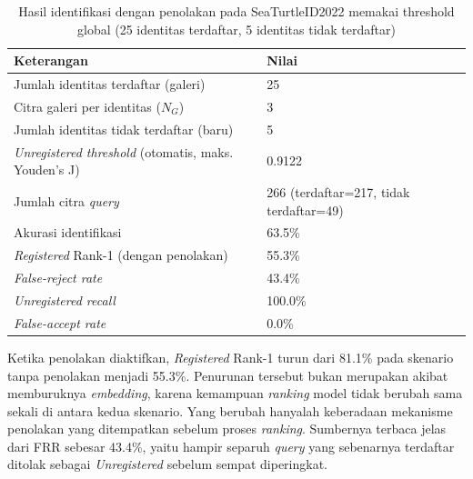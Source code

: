 \begin{table}[htbp]
    \centering
    \caption{Hasil identifikasi dengan penolakan pada SeaTurtleID2022 memakai threshold global (25 identitas terdaftar, 5 identitas tidak terdaftar)}
    \label{tab:crossdataset_seaturtleid2022}
    \renewcommand{\arraystretch}{1.25}
    \begin{tabular}{ll}
        \hline
        \textbf{Keterangan}                                          & \textbf{Nilai}                          \\
        \hline
        Jumlah identitas terdaftar (galeri)                          & 25                                      \\
        Citra galeri per identitas ($N_G$)                           & 3                                       \\
        Jumlah identitas tidak terdaftar (baru)                      & 5                                       \\
        \textit{Unregistered threshold} (otomatis, maks. Youden's J) & 0{.}9122                                \\
        Jumlah citra \textit{query}                                  & 266 (terdaftar=217, tidak terdaftar=49) \\
        Akurasi identifikasi                                         & 63.5\%                                  \\
        \textit{Registered} Rank-1 (dengan penolakan)                & 55.3\%                                  \\
        \textit{False-reject rate}                                   & 43.4\%                                  \\
        \textit{Unregistered recall}                                 & 100.0\%                                 \\
        \textit{False-accept rate}                                   & 0.0\%                                   \\
        \hline
    \end{tabular}
\end{table}

Ketika penolakan diaktifkan, \textit{Registered} Rank-1 turun dari 81.1\% pada skenario
tanpa penolakan menjadi 55.3\%. Penurunan tersebut bukan merupakan akibat memburuknya
\textit{embedding}, karena kemampuan \textit{ranking} model tidak berubah sama sekali di
antara kedua skenario. Yang berubah hanyalah keberadaan mekanisme penolakan yang
ditempatkan sebelum proses \textit{ranking}. Sumbernya terbaca jelas dari FRR sebesar
43.4\%, yaitu hampir separuh \textit{query} yang sebenarnya terdaftar ditolak sebagai
\textit{Unregistered} sebelum sempat diperingkat.

